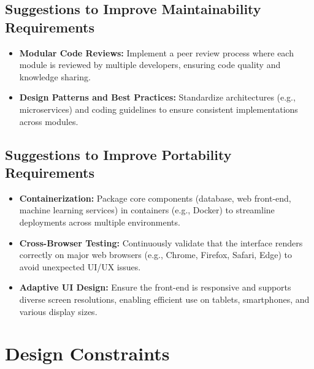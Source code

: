 \subsection{Suggestions to Improve Maintainability Requirements}
\begin{itemize}
    \item \textbf{Modular Code Reviews:} Implement a peer review process where each module is reviewed by multiple developers, ensuring code quality and knowledge sharing.
    \item \textbf{Design Patterns and Best Practices:} Standardize architectures (e.g., microservices) and coding guidelines to ensure consistent implementations across modules.
\end{itemize}

\subsection{Suggestions to Improve Portability Requirements}
\begin{itemize}
    \item \textbf{Containerization:} Package core components (database, web front-end, machine learning services) in containers (e.g., Docker) to streamline deployments across multiple environments.
    \item \textbf{Cross-Browser Testing:} Continuously validate that the interface renders correctly on major web browsers (e.g., Chrome, Firefox, Safari, Edge) to avoid unexpected UI/UX issues.
    \item \textbf{Adaptive UI Design:} Ensure the front-end is responsive and supports diverse screen resolutions, enabling efficient use on tablets, smartphones, and various display sizes.
\end{itemize}

\section{Design Constraints}

